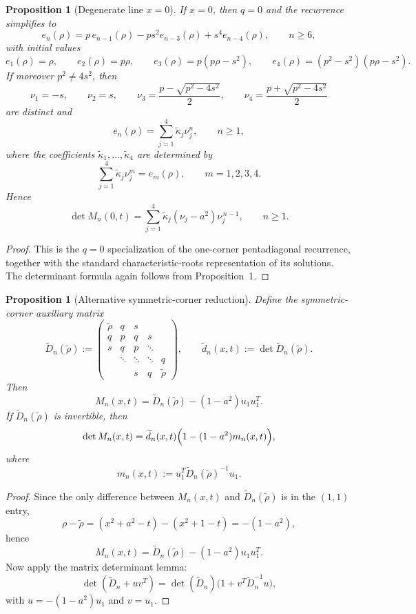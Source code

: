 \documentclass[11pt]{article}
\numberwithin{equation}{section}
\newtheorem{proposition}[theorem]{Proposition}
\begin{document}
\begin{proposition}[Degenerate line $x=0$]
If $x=0$, then $q=0$ and the recurrence simplifies to
\[
e_n(\rho)=p\,e_{n-1}(\rho)-p s^2 e_{n-3}(\rho)+s^4 e_{n-4}(\rho),
\qquad n\ge 6,
\]
with initial values
\[
e_1(\rho)=\rho,\qquad
e_2(\rho)=p\rho,\qquad
e_3(\rho)=p(p\rho-s^2),\qquad
e_4(\rho)=(p^2-s^2)(p\rho-s^2).
\]
If moreover $p^2\neq 4s^2$, then
\[
\nu_1=-s,\qquad \nu_2=s,\qquad
\nu_3=\frac{p-\sqrt{p^2-4s^2}}{2},\qquad
\nu_4=\frac{p+\sqrt{p^2-4s^2}}{2}
\]
are distinct and
\[
e_n(\rho)=\sum_{j=1}^4 \widetilde\kappa_j \nu_j^n,
\qquad n\ge 1,
\]
where the coefficients $\widetilde\kappa_1,\dots,\widetilde\kappa_4$ are determined by
\[
\sum_{j=1}^4 \widetilde\kappa_j \nu_j^m=e_m(\rho),
\qquad m=1,2,3,4.
\]
Hence
\[
\det M_n(0,t)
=
\sum_{j=1}^4 \widetilde\kappa_j(\nu_j-a^2)\nu_j^{\,n-1},
\qquad n\ge 1.
\]
\end{proposition}

\begin{proof}
This is the $q=0$ specialization of the one-corner pentadiagonal recurrence, together
with the standard characteristic-roots representation of its solutions. The determinant
formula again follows from Proposition~1.
\end{proof}

\begin{proposition}[Alternative symmetric-corner reduction]
Define the symmetric-corner auxiliary matrix
\[
\widetilde D_n(\widetilde\rho):=
\begin{pmatrix}
\widetilde\rho & q & s \\
q & p & q & s \\
s & q & p & \ddots \\
& \ddots & \ddots & \ddots & q \\
& & s & q & \widetilde\rho
\end{pmatrix},
\qquad
\widetilde d_n(x,t):=\det \widetilde D_n(\widetilde\rho).
\]
Then
\[
M_n(x,t)=\widetilde D_n(\widetilde\rho)-(1-a^2)u_1u_1^T.
\]
If $\widetilde D_n(\widetilde\rho)$ is invertible, then
\[
\det M_n(x,t)
=
\widetilde d_n(x,t)\Bigl(1-(1-a^2)m_n(x,t)\Bigr),
\]
where
\[
m_n(x,t):=u_1^T\widetilde D_n(\widetilde\rho)^{-1}u_1.
\]
\end{proposition}

\begin{proof}
Since the only difference between $M_n(x,t)$ and $\widetilde D_n(\widetilde\rho)$ is in the
$(1,1)$ entry,
\[
\rho-\widetilde\rho=(x^2+a^2-t)-(x^2+1-t)=-(1-a^2),
\]
hence
\[
M_n(x,t)=\widetilde D_n(\widetilde\rho)-(1-a^2)u_1u_1^T.
\]
Now apply the matrix determinant lemma:
\[
\det(\widetilde D_n+uv^T)=\det(\widetilde D_n)\bigl(1+v^T\widetilde D_n^{-1}u\bigr),
\]
with $u=-(1-a^2)u_1$ and $v=u_1$.
\end{proof}
\end{document}
